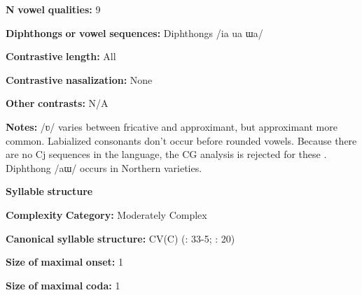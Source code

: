 \documentclass[output=paper]{langsci/langscibook}
\begin{document}
\begin{styleBody}
\textbf{N} \textbf{vowel} \textbf{qualities:} 9
\end{styleBody}

\begin{styleBody}
\textbf{Diphthongs} \textbf{or} \textbf{vowel} \textbf{sequences:} Diphthongs /ia ua ɯa/
\end{styleBody}

\begin{styleBody}
\textbf{Contrastive} \textbf{length:} All
\end{styleBody}

\begin{styleBody}
\textbf{Contrastive} \textbf{nasalization:} None
\end{styleBody}

\begin{styleBody}
\textbf{Other} \textbf{contrasts:} N/A
\end{styleBody}

\begin{styleBody}
\textbf{Notes:} /ʋ/ varies between fricative and approximant, but approximant more common. Labialized consonants don’t occur before rounded vowels. Because there are no Cj sequences in the language, the CG analysis is rejected for these \citep[138]{Erickson2001}. Diphthong /aɯ/ occurs in Northern varieties.
\end{styleBody}

\begin{styleBody}
\textbf{Syllable} \textbf{structure}
\end{styleBody}

\begin{styleBody}
\textbf{Complexity} \textbf{Category:} Moderately Complex
\end{styleBody}

\begin{styleBody}
\textbf{Canonical} \textbf{syllable} \textbf{structure:} CV(C) (\citealt{Enfield2007}: 33-5; \citealt{MorevEtAl1979}: 20)
\end{styleBody}

\begin{styleBody}
\textbf{Size} \textbf{of} \textbf{maximal} \textbf{onset:} 1
\end{styleBody}

\begin{styleBody}
\textbf{Size} \textbf{of} \textbf{maximal} \textbf{coda:} 1
\end{styleBody}
\end{document}
